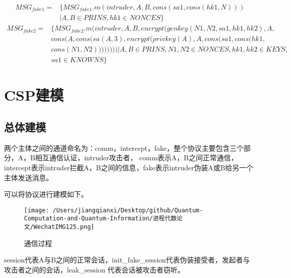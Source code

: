 \documentclass[UTF8]{ctexart}
\begin{document}
{\begin{equation}
	\begin{aligned}
		MSG_{fake1}= &\{ MSG_{fake1}.m(intruder,A,B,cons(sa1,cons(hk1,N))) \\
		&|A,B \in PRINS, hk1 \in NONCES\}
\end{aligned}
\end{equation}
\begin{equation}
	\begin{aligned}
		MSG_{fake2}= &\{ MSG_{fake2}.m(intruder,A,B,encrypt(genkey(N1,N2,sa1,hk1,hk2),A,\\
		&cons(A,cons(sa(A,3),encrypt(privkey(A),A,cons(sa1,cons(hk1, \\
		&cons(N1,N2))))))))|A,B \in PRINS, N1,N2 \in NONCES ,hk1,hk2 \in KEYS, \\
		&sa1 \in KNOWNS \}
\end{aligned}
\end{equation}
}
\section{CSP建模}
\subsection{总体建模}
	\par{
	两个主体之间的通道命名为：comm，intercept，fake，整个协议主要包含三个部分，A，B相互通信认证，intruder攻击者，
	comm表示A，B之间正常通信，intercept表示intruder拦截A，B之间的信息，fake表示intruder伪装A或B给另一个主体发送消息。

	可以将协议进行建模如下。
	\begin{figure}[h]
		\centering
		\texttt{[image: /Users/jiangqianxi/Desktop/github/Quantum-Computation-and-Quantum-Information/进程代数论文/WechatIMG125.png]}
		\caption{通信过程}
		\end{figure}
	session代表A与B之间的正常会话，init\_fake\_session代表伪装接受者，发起者与攻击者之间的会话，leak\_session 代表会话被攻击者窃听。
		}
\end{document}
